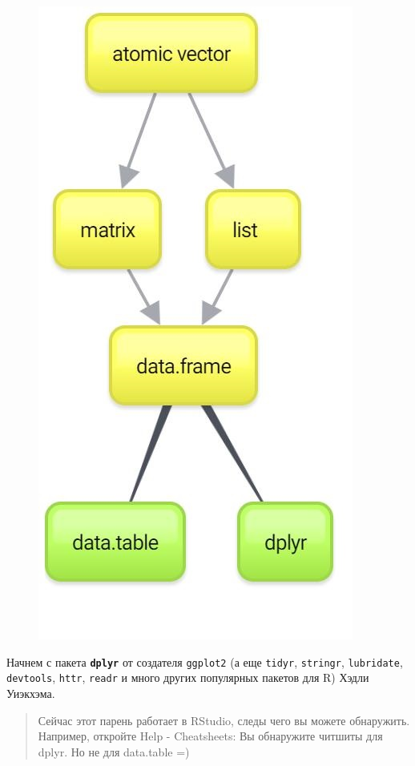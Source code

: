 \documentclass[]{book}
\begin{document}
\begin{figure}
\centering
\includegraphics{images/New-Mind-Map_1.jpg}
\caption{}
\end{figure}

Начнем с пакета \textbf{\texttt{dplyr}} от создателя \texttt{ggplot2} (а
еще \texttt{tidyr}, \texttt{stringr}, \texttt{lubridate},
\texttt{devtools}, \texttt{httr}, \texttt{readr} и много других
популярных пакетов для R) Хэдли Уиэкхэма.

\begin{quote}
Сейчас этот парень работает в RStudio, следы чего вы можете обнаружить.
Например, откройте Help - Cheatsheets: Вы обнаружите читшиты для dplyr.
Но не для data.table =)
\end{quote}
\end{document}
